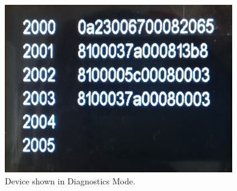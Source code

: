 \begin{figure}[H]
\begin{center}
\includegraphics[width=10cm]{Figures/diagnostics.png}
\end{center}
\caption{Device shown in Diagnostics Mode.}
\label{fig:diagnostics}
\end{figure}
